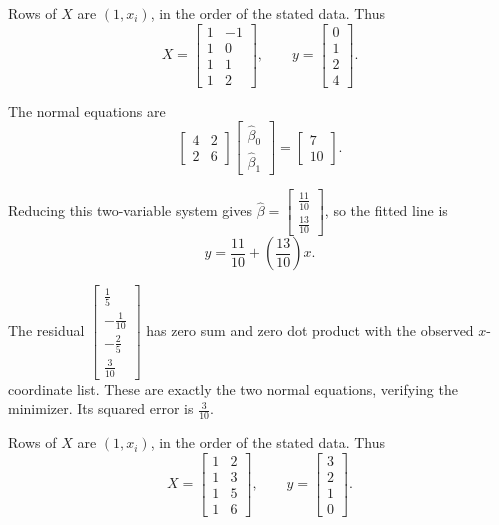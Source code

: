 Rows of $X$ are $(1,x_i)$, in the order of the stated data. Thus
\[ X=\begin{bmatrix}1 & -1\\1 & 0\\1 & 1\\1 & 2\end{bmatrix},\qquad y=\begin{bmatrix}0\\1\\2\\4\end{bmatrix}.\]

The normal equations are
\[ \begin{bmatrix}4 & 2\\2 & 6\end{bmatrix}\begin{bmatrix}\widehat\beta_0\\\widehat\beta_1\end{bmatrix}=\begin{bmatrix}7\\10\end{bmatrix}.\]

Reducing this two-variable system gives $\widehat\beta=\begin{bmatrix}\frac{11}{10}\\\frac{13}{10}\end{bmatrix}$, so the fitted line is
\[ \boxed{y=\frac{11}{10}+(\frac{13}{10})x}.\]

The residual $\begin{bmatrix}\frac{1}{5}\\- \frac{1}{10}\\- \frac{2}{5}\\\frac{3}{10}\end{bmatrix}$ has zero sum and zero dot product with the observed $x$-coordinate list. These are exactly the two normal equations, verifying the minimizer. Its squared error is $\frac{3}{10}$.

Rows of $X$ are $(1,x_i)$, in the order of the stated data. Thus
\[ X=\begin{bmatrix}1 & 2\\1 & 3\\1 & 5\\1 & 6\end{bmatrix},\qquad y=\begin{bmatrix}3\\2\\1\\0\end{bmatrix}.\]

